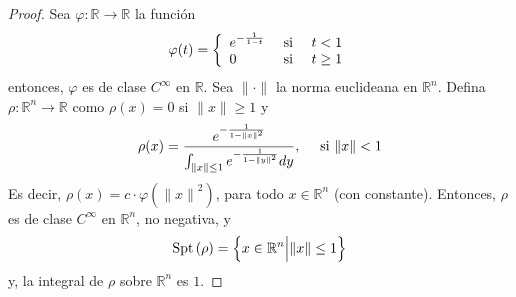 \documentclass[12pt]{report}
\theoremstyle{largebreak}
\newcommand\cf[3]{\ensuremath{#1:#2\rightarrow#3}}
\newcommand\norm[1]{\ensuremath{\|#1\|}}
\newcommand{\Spt}[1]{\ensuremath{\textup{Spt}\left(#1\right)}}
\begin{document}
    \begin{proof}
        Sea $\cf{\varphi}{\mathbb{R}}{\mathbb{R}}$ la función
        \begin{equation*}
            \varphi(t)=\left\{
                \begin{array}{lcr}
                    e^{-\frac{1}{1-t}} & \textup{ si } & t<1\\
                    0 & \textup{ si } & t\geq 1\\
                \end{array}
            \right.
        \end{equation*}
        entonces, $\varphi$ es de clase $C^\infty$ en $\mathbb{R}$. Sea $\norm{\cdot}$ la norma euclideana en $\mathbb{R}^n$. Defina $\cf{\rho}{\mathbb{R}^n}{\mathbb{R}}$ como $\rho(x)=0$ si $\norm{x}\geq 1$ y
        \begin{equation*}
            \rho(x)=\frac{e^{-\frac{1}{1-\norm{x}^2}}}{\int_{\norm{x}\leq 1}e^{-\frac{1}{1-\norm{y}^2}}dy},\quad\textup{ si }\norm{x}<1
        \end{equation*}
        Es decir, $\rho(x)=c\cdot\varphi(\norm{x}^2)$, para todo $x\in\mathbb{R}^n$ (con constante). Entonces, $\rho$ es de clase $C^\infty$ en $\mathbb{R}^n$, no negativa, y
        \begin{equation*}
            \Spt{\rho}=\left\{x\in\mathbb{R}^n\Big|\norm{x}\leq1 \right\}
        \end{equation*}
        y, la integral de $\rho$ sobre $\mathbb{R}^n$ es $1$.


\end{proof}
\end{document}
